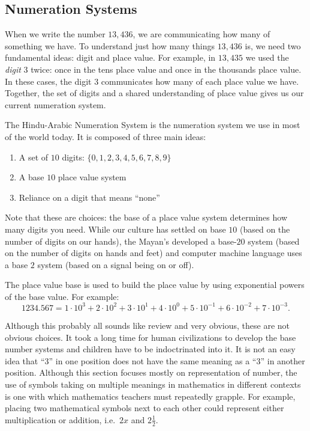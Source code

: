 \documentclass[
]{book}
\providecommand{\tightlist}{%
  \setlength{\itemsep}{0pt}\setlength{\parskip}{0pt}}
\theoremstyle{definition}
\theoremstyle{definition}
\theoremstyle{definition}
\theoremstyle{definition}
\theoremstyle{remark}
\begin{document}
\hypertarget{numeration-systems}{%
\subsection{Numeration Systems}\label{numeration-systems}}

When we write the number \(13,436\), we are communicating how many of something we have. To understand just how many things \(13,436\) is, we need two fundamental ideas: digit and place value. For example, in \(13,435\) we used the \textit{digit} \(3\) twice: once in the tens place value and once in the thousands place value. In these cases, the digit \(3\) communicates how many of each place value we have. Together, the set of digits and a shared understanding of place value gives us our current numeration system.

The Hindu-Arabic Numeration System is the numeration system we use in most of the world today. It is composed of three main ideas:

\begin{enumerate}
\def\labelenumi{\arabic{enumi}.}
\tightlist
\item
  A set of \(10\) digits: \(\{0,1,2,3,4,5,6,7,8,9\}\)
\item
  A base \(10\) place value system
\item
  Reliance on a digit that means ``none''
\end{enumerate}

Note that these are choices: the base of a place value system determines how many digits you need. While our culture has settled on base \(10\) (based on the number of digits on our hands), the Mayan's developed a base-\(20\) system (based on the number of digits on hands and feet) and computer machine language uses a base \(2\) system (based on a signal being on or off).

The place value base is used to build the place value by using exponential powers of the base value. For example:
\[1234.567 = 1 \cdot 10^3 + 2\cdot 10^2 + 3\cdot 10^1 + 4\cdot 10^0 + 5\cdot 10^{-1} + 6 \cdot 10^{-2} + 7 \cdot 10^{-3}.\]

Although this probably all sounds like review and very obvious, these are not obvious choices. It took a long time for human civilizations to develop the base number systems and children have to be indoctrinated into it. It is not an easy idea that ``3'' in one position does not have the same meaning as a ``3'' in another position. Although this section focuses mostly on representation of number, the use of symbols taking on multiple meanings in mathematics in different contexts is one with which mathematics teachers must repeatedly grapple. For example, placing two mathematical symbols next to each other could represent either multiplication or addition, i.e.~\(2x\) and \(2\frac{1}{2}\).
\end{document}
